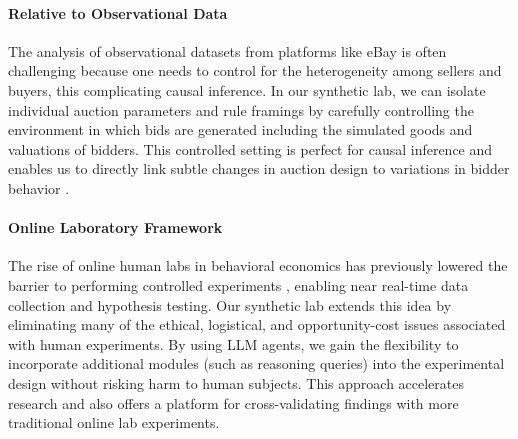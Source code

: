 \paragraph{Relative to Observational Data}
The analysis of observational datasets from platforms like eBay is often challenging because one
needs to control for the heterogeneity among sellers and buyers, this complicating causal inference.
%
In our synthetic lab, we can isolate individual auction parameters and rule framings by carefully 
controlling the environment in which bids are generated including the simulated goods and valuations of bidders. 
This controlled setting is perfect for
causal inference and enables us to directly link subtle changes in auction design to variations in bidder behavior \citep{manning2024automated}.


\paragraph{Online Laboratory Framework}
The rise of online human labs \citep{horton2011online} in behavioral economics has previously lowered the barrier to performing controlled experiments \citep{oprea2024decisions, enke2024behavioral}, enabling near real-time data collection and hypothesis testing. 
Our synthetic lab extends this idea by eliminating many of the ethical, logistical, and opportunity-cost issues associated with human experiments. 
By using LLM agents, we gain the flexibility to incorporate additional modules (such as reasoning queries) into the experimental design without risking harm to human subjects. 
This approach accelerates research and also offers a platform for cross-validating findings with more traditional online lab experiments.


